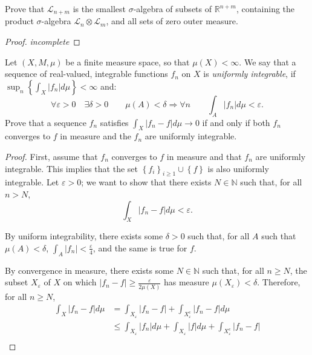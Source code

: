 \documentclass[12pt]{article}
\newcommand{\N}{\mathbb{N}}
\newcommand{\R}{\mathbb{R}}
\theoremstyle{definition}
\newenvironment{problem}[2][Problem]{\begin{trivlist}
\item[\hskip \labelsep {\bfseries #1}\hskip \labelsep {\bfseries #2.}]}{\end{trivlist}}
\begin{document}
\begin{problem}{4}
	Prove that $\mathcal{L}_{n+m}$ is the smallest $\sigma$-algebra of subsets of $\R^{n+m}$, containing the product $\sigma$-algebra $\mathcal{L}_n \otimes \mathcal{L}_m$, and all sets of zero outer measure.
	\begin{proof}
		\textit{incomplete}
	\end{proof}

\end{problem}
\begin{problem}{5}
	Let $(X, M, \mu)$ be a finite measure space, so that $\mu(X)< \infty$. We say that a sequence of real-valued, integrable functions $f_n$ on $X$ is \textit{uniformly integrable}, if $\sup_n\left\{ \int_X \left \lvert { f_n } \right \lvert d\mu \right\}< \infty$ and:
	\[\forall \varepsilon > 0 \quad \exists \delta > 0 \qquad \mu(A)< \delta \Rightarrow \forall n \qquad \int_A \left \lvert { f_n } \right \lvert d\mu < \varepsilon.\]
	Prove that a sequence $f_n$ satisfies $\int_X \left \lvert { f_n - f } \right \lvert  d\mu \to 0$ if and only if both $f_n$ converges to $f$ in measure and the $f_n$ are uniformly integrable.
	\begin{proof}
		First, assume that $f_n$ converges to $f$ in measure and that $f_n$ are uniformly integrable. This implies that the set $\left\{ f_i \right\}_{i \geq 1} \cup \left\{ f \right\}$ is also uniformly integrable. Let $\varepsilon > 0$; we want to show that there exists $N\in \N$ such that, for all $n > N$,
		\[ \int_X \left \lvert { f_n - f } \right \lvert d\mu < \varepsilon.\]
		\par By uniform integrability, there exists some $\delta > 0$ such that, for all $A$ such that $\mu(A) < \delta$, $\int_A \left \lvert { f_n } \right \lvert < \frac{\varepsilon}{4}$, and the same is true for $f$. 
		\par By convergence in measure, there exists some $N \in \N$ such that, for all $n \geq N$, the subset $X_\varepsilon$ of $X$ on which $\left \lvert {  f_n - f } \right \lvert \geq \frac{\varepsilon}{2\mu(X)}$ has measure $\mu(X_\varepsilon) < \delta$. Therefore, for all $n \geq N$,
		\begin{align*}
			\int_X \left \lvert { f_n - f } \right \lvert d\mu &= \int_{X_\varepsilon} \left \lvert { f_n - f } \right \lvert + \int_{X_\varepsilon^c} \left \lvert { f_n - f } \right \lvert d\mu\\
			&\leq \int_{X_\varepsilon} \left \lvert { f_n } \right \lvert  d\mu + \int_{X_\varepsilon} \left \lvert { f } \right \lvert d\mu + \int_{X_\varepsilon^c} \left \lvert { f_n - f } \right \lvert \\

\end{align*}
\end{proof}
\end{problem}
\end{document}
